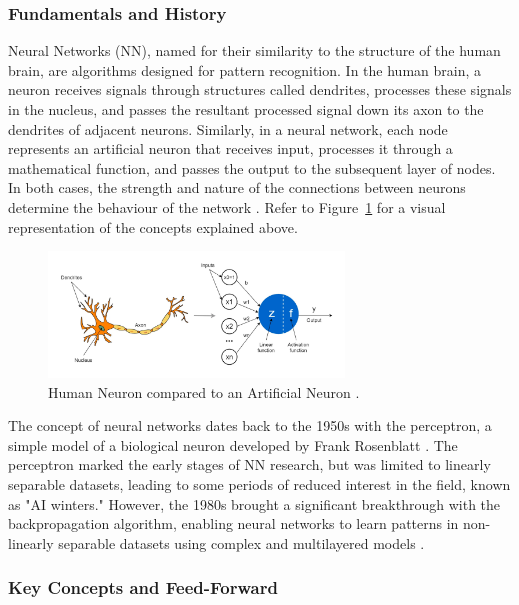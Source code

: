 \subsubsection{Fundamentals and History}

Neural Networks (NN), named for their similarity to the structure of the human brain, are algorithms designed for pattern recognition. In the human brain, a neuron receives signals through structures called dendrites, processes these signals in the nucleus, and passes the resultant processed signal down its axon to the dendrites of adjacent neurons. Similarly, in a neural network, each node represents an artificial neuron that receives input, processes it through a mathematical function, and passes the output to the subsequent layer of nodes. In both cases, the strength and nature of the connections between neurons determine the behaviour of the network \cite{goodfellow_deep_2016}. Refer to Figure~\ref{Figure:HumanNeuronVsArtificialNeuron} for a visual representation of the concepts explained above.

\begin{figure}[htb!]
\centering
\includegraphics[width=0.7\textwidth]{Images/HumanNeuronVsArtificialNeuron.png}
\caption{Human Neuron compared to an Artificial Neuron \cite{pramoditha_human_nodate}.}
\label{Figure:HumanNeuronVsArtificialNeuron}
\end{figure}

The concept of neural networks dates back to the 1950s with the perceptron, a simple model of a biological neuron developed by Frank Rosenblatt \cite{rosenblatt_perceptron_1958}. The perceptron marked the early stages of NN research, but was limited to linearly separable datasets, leading to some periods of reduced interest in the field, known as "AI winters." However, the 1980s brought a significant breakthrough with the backpropagation algorithm, enabling neural networks to learn patterns in non-linearly separable datasets using complex and multilayered models \cite{rumelhart_learning_1986}.

\subsubsection{Key Concepts and Feed-Forward}

